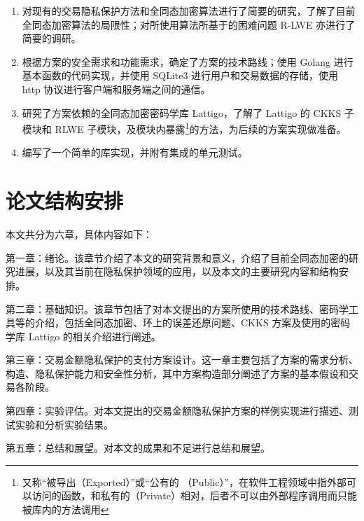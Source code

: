 \begin{enumerate}
    \item 对现有的交易隐私保护方法和全同态加密算法进行了简要的研究，了解了目前全同态加密算法的局限性；对所使用算法所基于的困难问题 R-LWE 亦进行了简要的调研。
    \item 根据方案的安全需求和功能需求，确定了方案的技术路线；使用 Golang 进行基本函数的代码实现，并使用 SQLite3 进行用户和交易数据的存储，使用 http 协议进行客户端和服务端之间的通信。
    \item 研究了方案依赖的全同态加密密码学库 Lattigo\cite{lattigoRepo}，了解了 Lattigo 的 CKKS 子模块和 RLWE 子模块，及模块内暴露\footnote{又称“被导出（Exported）”或“公有的 （Public）”，在软件工程领域中指外部可以访问的函数，和私有的（Private）相对，后者不可以由外部程序调用而只能被库内的方法调用}的方法，为后续的方案实现做准备。
    \item 编写了一个简单的库实现，并附有集成的单元测试。
\end{enumerate}

\section{论文结构安排}

本文共分为六章，具体内容如下：

第一章：绪论。该章节介绍了本文的研究背景和意义，介绍了目前全同态加密的研究进展，以及其当前在隐私保护领域的应用，以及本文的主要研究内容和结构安排。

第二章：基础知识。该章节包括了对本文提出的方案所使用的技术路线、密码学工具等的介绍，包括全同态加密、环上的误差还原问题、CKKS 方案及使用的密码学库 Lattigo 的相关介绍进行阐述。

第三章：交易金额隐私保护的支付方案设计。这一章主要包括了方案的需求分析、构造、隐私保护能力和安全性分析，其中方案构造部分阐述了方案的基本假设和交易各阶段。

第四章：实验评估。对本文提出的交易金额隐私保护方案的样例实现进行描述、测试实验和分析实验结果。

第五章：总结和展望。对本文的成果和不足进行总结和展望。
